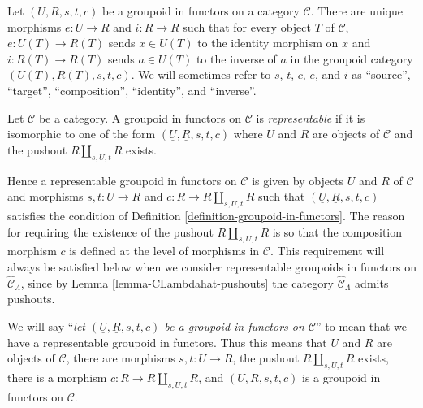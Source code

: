 \begin{remark}
\label{remark-identity-inverse}
Let $(U, R, s, t, c)$ be a groupoid in functors on a category $\mathcal{C}$.
There are unique morphisms $e : U \to R$ and $i : R \to R$ such that
for every object $T$ of $\mathcal{C}$, $e: U(T) \to R(T)$ sends
$x \in U(T)$ to the identity morphism on $x$ and $i: R(T) \to R(T)$ sends
$a \in U(T)$ to the inverse of $a$ in the groupoid category
$(U(T), R(T), s, t, c)$. We will sometimes refer to $s$, $t$, $c$, $e$,
and $i$ as ``source'', ``target'', ``composition'', ``identity'', and
``inverse''.
\end{remark}

\begin{definition}
\label{definition-representable}
Let $\mathcal{C}$ be a category. A groupoid in functors on $\mathcal{C}$ is
{\it representable} if it is isomorphic to one of the form
$(\underline{U}, \underline{R}, s, t, c)$ where $U$ and $R$ are objects of
$\mathcal{C}$ and the pushout $R \amalg_{s, U, t} R$ exists.
\end{definition}

\begin{remark}
\label{remark-reason-existence-coproduct}
Hence a representable groupoid in functors on $\mathcal{C}$ is given by
objects $U$ and $R$ of $\mathcal{C}$ and morphisms $s, t : U \to R$ and
$c : R \to R \amalg_{s, U, t} R$ such that
$(\underline{U}, \underline{R}, s, t, c)$ satisfies the condition of
Definition \ref{definition-groupoid-in-functors}. The reason for requiring
the existence of the pushout $R \amalg_{s, U, t} R$ is so that the composition
morphism $c$ is defined at the level of morphisms in $\mathcal{C}$.
This requirement will always be satisfied below when we consider
representable groupoids in functors on
$\widehat{\mathcal{C}}_\Lambda$, since by
Lemma \ref{lemma-CLambdahat-pushouts}
the category $\widehat{\mathcal{C}}_\Lambda$ admits pushouts.
\end{remark}

\begin{remark}
\label{remark-simplify-terminology}
We will say ``{\it let $(\underline{U}, \underline{R}, s, t, c)$ be a
groupoid in functors on $\mathcal{C}$}'' to mean that we have
a representable groupoid in functors. Thus this means that
$U$ and $R$ are objects of $\mathcal{C}$, there are morphisms
$s, t : U \to R$, the pushout $R \amalg_{s, U, t} R$ exists,
there is a morphism $c : R \to R \amalg_{s, U, t} R$, and
$(\underline{U}, \underline{R}, s, t, c)$ is a
groupoid in functors on $\mathcal{C}$.
\end{remark}

